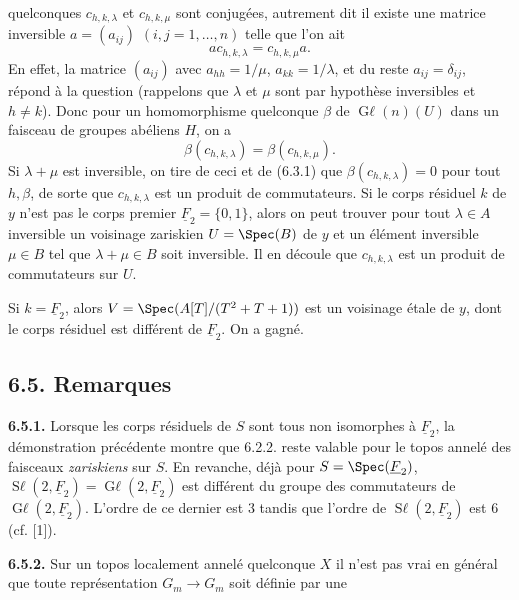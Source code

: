 
quelconques \(c_{h,k,\lambda}\) et \(c_{h,k,\mu}\) sont conjugées, autrement dit il existe une matrice inversible \(a=(a_{ij})\) \((i,j=1,\ldots,n)\) telle que l'on ait
\[
 ac_{h,k,\lambda}=c_{h,k,\mu}a.
\]
En effet, la matrice \((a_{ij})\) avec \(a_{hh}=1/\mu\), \(a_{kk}=1/\lambda\), et du reste \(a_{ij}=\delta_{ij}\), répond à la question (rappelons que \(\lambda\) et \(\mu\) sont par hypothèse inversibles et \(h\ne k\)). Donc pour un homomorphisme quelconque \(\beta\) de \(\operatorname{G\ell}(n)(U)\) dans un faisceau de groupes abéliens \(H\), on a
\[
 \beta(c_{h,k,\lambda})=\beta(c_{h,k,\mu}).
\]
Si \(\lambda+\mu\) est inversible, on tire de ceci et de (6.3.1) que \(\beta(c_{h,k,\lambda})=0\) pour tout \(h,\beta\), de sorte que \(c_{h,k,\lambda}\) est un produit de commutateurs. Si le corps résiduel \(k\) de \(y\) n'est pas le corps premier \(\underline{F}_2=\{0,1\}\), alors on peut trouver pour tout \(\lambda\in A\) inversible un voisinage zariskien \(U=\Spec(B)\) de \(y\) et un élément inversible \(\mu\in B\) tel que \(\lambda+\mu\in B\) soit inversible. Il en découle que \(c_{h,k,\lambda}\) est un produit de commutateurs sur \(U\).

Si \(k=\underline{F}_2\), alors \(V=\Spec(A[T]/(T^2+T+1))\) est un voisinage étale de \(y\), dont le corps résiduel est différent de \(\underline{F}_2\). On a gagné.

\subsection*{6.5. Remarques}
\textbf{6.5.1.} Lorsque les corps résiduels de \(S\) sont tous non isomorphes à \(\underline{F}_2\), la démonstration précédente montre que 6.2.2. reste valable pour le topos annelé des faisceaux \emph{zariskiens} sur \(S\). En revanche, déjà pour \(S=\Spec(\underline{F}_2)\), \(\operatorname{S\ell}(2,\underline{F}_2)=\operatorname{G\ell}(2,\underline{F}_2)\) est différent du groupe des commutateurs de \(\operatorname{G\ell}(2,\underline{F}_2)\). L'ordre de ce dernier est \(3\) tandis que l'ordre de \(\operatorname{S\ell}(2,\underline{F}_2)\) est \(6\) (cf. [1]).

\textbf{6.5.2.} Sur un topos localement annelé quelconque \(X\) il n'est pas vrai en général que toute représentation \(G_m\to G_m\) soit définie par une
